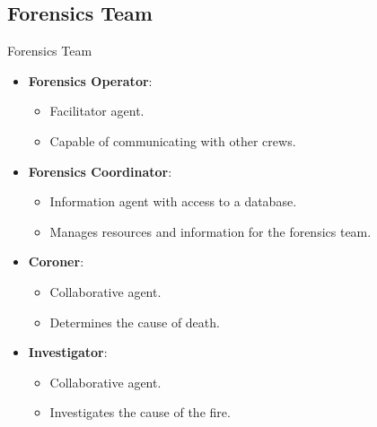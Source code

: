 \subsection{Forensics Team}
\begin{frame}{Forensics Team}
    \begin{itemize}
        \item \textbf{Forensics Operator}: 
        \begin{itemize}
            \item \alert{Facilitator} agent.
            \item Capable of \alert{communicating} with other crews.
        \end{itemize}
        \item \textbf{Forensics Coordinator}: 
        \begin{itemize}
            \item \alert{Information} agent with access to a \alert{database}.
            \item Manages resources and information for the forensics team.
        \end{itemize}
        \item \textbf{Coroner}: 
        \begin{itemize}
            \item \alert{Collaborative} agent.
            \item Determines the cause of death.
        \end{itemize}
        \item \textbf{Investigator}: 
        \begin{itemize}
            \item \alert{Collaborative} agent.
            \item Investigates the cause of the fire.
        \end{itemize}
    \end{itemize}
    
\end{frame} 